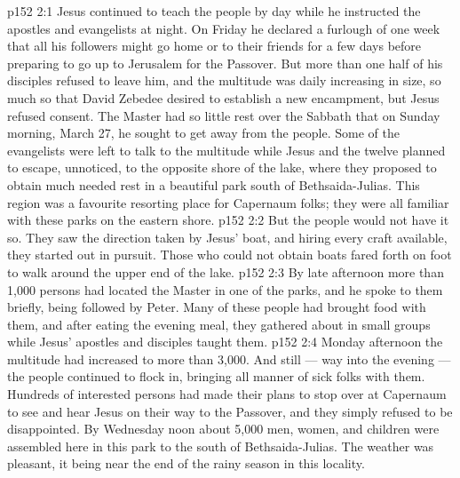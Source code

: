 \vs p152 2:1 Jesus continued to teach the people by day while he instructed the apostles and evangelists at night. On Friday he declared a furlough of one week that all his followers might go home or to their friends for a few days before preparing to go up to Jerusalem for the Passover. But more than one half of his disciples refused to leave him, and the multitude was daily increasing in size, so much so that David Zebedee desired to establish a new encampment, but Jesus refused consent. The Master had so little rest over the Sabbath that on Sunday morning, March 27, he sought to get away from the people. Some of the evangelists were left to talk to the multitude while Jesus and the twelve planned to escape, unnoticed, to the opposite shore of the lake, where they proposed to obtain much needed rest in a beautiful park south of Bethsaida\hyp{}Julias. This region was a favourite resorting place for Capernaum folks; they were all familiar with these parks on the eastern shore.
\vs p152 2:2 But the people would not have it so. They saw the direction taken by Jesus’ boat, and hiring every craft available, they started out in pursuit. Those who could not obtain boats fared forth on foot to walk around the upper end of the lake.
\vs p152 2:3 By late afternoon more than 1,000 persons had located the Master in one of the parks, and he spoke to them briefly, being followed by Peter. Many of these people had brought food with them, and after eating the evening meal, they gathered about in small groups while Jesus’ apostles and disciples taught them.
\vs p152 2:4 Monday afternoon the multitude had increased to more than 3,000. And still --- way into the evening --- the people continued to flock in, bringing all manner of sick folks with them. Hundreds of interested persons had made their plans to stop over at Capernaum to see and hear Jesus on their way to the Passover, and they simply refused to be disappointed. By Wednesday noon about 5,000 men, women, and children were assembled here in this park to the south of Bethsaida\hyp{}Julias. The weather was pleasant, it being near the end of the rainy season in this locality.

